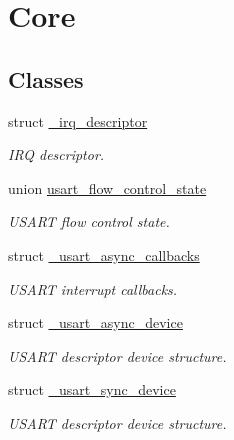 \hypertarget{group___h_p_l}{}\section{Core}
\label{group___h_p_l}
\subsection*{Classes}
\begin{DoxyCompactItemize}
\item 
struct \hyperlink{struct__irq__descriptor}{\+\_\+irq\+\_\+descriptor}
\begin{DoxyCompactList}\small\item\em I\+RQ descriptor. \end{DoxyCompactList}\item 
union \hyperlink{unionusart__flow__control__state}{usart\+\_\+flow\+\_\+control\+\_\+state}
\begin{DoxyCompactList}\small\item\em U\+S\+A\+RT flow control state. \end{DoxyCompactList}\item 
struct \hyperlink{struct__usart__async__callbacks}{\+\_\+usart\+\_\+async\+\_\+callbacks}
\begin{DoxyCompactList}\small\item\em U\+S\+A\+RT interrupt callbacks. \end{DoxyCompactList}\item 
struct \hyperlink{struct__usart__async__device}{\+\_\+usart\+\_\+async\+\_\+device}
\begin{DoxyCompactList}\small\item\em U\+S\+A\+RT descriptor device structure. \end{DoxyCompactList}\item 
struct \hyperlink{struct__usart__sync__device}{\+\_\+usart\+\_\+sync\+\_\+device}
\begin{DoxyCompactList}\small\item\em U\+S\+A\+RT descriptor device structure. \end{DoxyCompactList}\end{DoxyCompactItemize}
